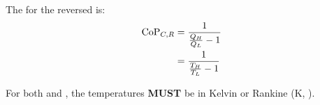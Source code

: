 The  for the reversed  is:
\begin{equation}\label{eq:Coefficient_of_Performance-Carnot_Cycle_Reversed}
  \begin{aligned}
    \text{CoP}_{C, R} &= \frac{1}{\frac{Q_{H}}{Q_{L}} - 1} \\
    &= \frac{1}{\frac{T_{H}}{T_{L}} - 1} \\
  \end{aligned}
\end{equation}

\begin{remark*}
  For both  and , the temperatures \textbf{MUST} be in Kelvin or Rankine (\si{\kelvin}, \si{\rankine}).
\end{remark*}

